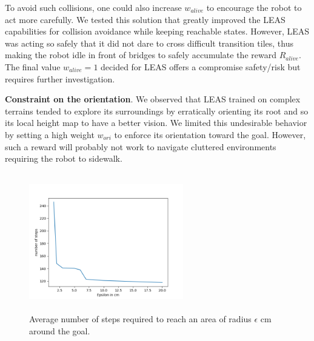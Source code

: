 To avoid such collisions, one could also increase $w_{alive}$ to encourage the robot to act more carefully. 
We tested this solution that greatly improved the LEAS capabilities for collision avoidance while keeping reachable states. However, LEAS was acting so safely that it did not dare to cross difficult transition tiles, thus making the robot idle in front of bridges to safely accumulate the reward $R_{alive}$. 
The final value $w_{alive}=1$ decided for LEAS offers a compromise safety/risk but requires further investigation. 

\hfill

\noindent\textbf{Constraint on the orientation}. 
We observed that LEAS trained on complex terrains tended to explore its surroundings by erratically orienting its root and so its local height map to have a better vision.
We limited this undesirable behavior by setting a high weight $w_{ori}$ to enforce its orientation toward the goal. 
However, such a reward will probably not work to navigate cluttered environments requiring the robot to sidewalk.

\begin{figure}
    \centering
    \includegraphics[width=0.6\textwidth, height=6cm]{Figures/Chapter_LEAS/test_epsilon.png}
    \caption{Average number of steps required to reach an area of radius $\epsilon$ cm around the goal.}
    \label{fig:nb_steps_required}
\end{figure}


